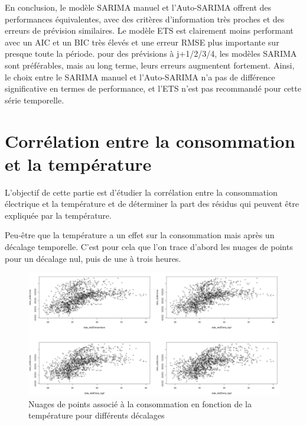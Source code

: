 \documentclass{article}
\theoremstyle{definition}
\theoremstyle{remark}
\begin{document}
En conclusion, le modèle SARIMA manuel et l’Auto-SARIMA offrent des performances équivalentes, avec des critères d’information très proches et des erreurs de prévision similaires. Le modèle ETS est clairement moins performant avec un AIC et un BIC très élevés et une erreur RMSE plus importante sur presque toute la période. pour des prévisions à j+1/2/3/4, les modèles SARIMA sont préférables, mais au long terme, leurs erreurs augmentent fortement. Ainsi, le choix entre le SARIMA manuel et l’Auto-SARIMA n’a pas de différence significative en termes de performance, et l’ETS n’est pas recommandé pour cette série temporelle.

\section{Corrélation entre la consommation et la température}
L'objectif de cette partie est d'étudier la corrélation entre la consommation électrique et la température et de déterminer la part des résidus qui peuvent être expliquée par la température.\newline

Peu-être que la température a un effet sur la consommation mais après un décalage temporelle. C'est pour cela que l'on trace d'abord les nuages de points pour un décalage nul, puis de une à trois heures.
\FloatBarrier
\begin{figure}[!h]
    \centering
    \includegraphics[width=0.75\linewidth]{fig12.png}
    \caption{Nuages de points associé à la consommation en fonction de la température pour différents décalages }
    \label{fig:enter-label}
\end{figure}
\end{document}
